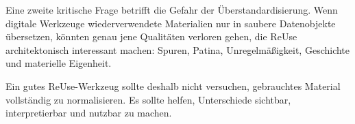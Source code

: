 Eine zweite kritische Frage betrifft die Gefahr der Überstandardisierung. Wenn digitale Werkzeuge wiederverwendete Materialien nur in saubere Datenobjekte übersetzen, könnten genau jene Qualitäten verloren gehen, die ReUse architektonisch interessant machen: Spuren, Patina, Unregelmäßigkeit, Geschichte und materielle Eigenheit.

Ein gutes ReUse-Werkzeug sollte deshalb nicht versuchen, gebrauchtes Material vollständig zu normalisieren. Es sollte helfen, Unterschiede sichtbar, interpretierbar und nutzbar zu machen.
